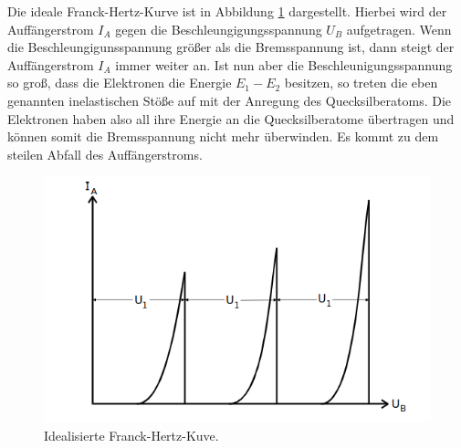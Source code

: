Die ideale Franck-Hertz-Kurve ist in Abbildung \ref{abb:2} dargestellt. Hierbei wird der Auffängerstrom $I_A$ gegen die Beschleungigungsspannung $U_B$
aufgetragen. Wenn die Beschleungigunsspannung größer als die Bremsspannung ist, dann steigt der Auffängerstrom $I_A$ immer weiter an. Ist nun aber die
Beschleunigungsspannung so groß, dass die Elektronen die Energie $E_1-E_2$ besitzen, so treten die eben genannten inelastischen Stöße auf mit der Anregung des
Quecksilberatoms. Die Elektronen haben also all ihre Energie an die Quecksilberatome übertragen und können somit die Bremsspannung nicht mehr überwinden. Es
kommt zu dem steilen Abfall des Auffängerstroms.

\begin{figure}
  \centering
  \includegraphics[scale=0.5]{Kurve.png}
  \caption{Idealisierte Franck-Hertz-Kuve.\cite{Q1}}
  \label{abb:2}
\end{figure}

